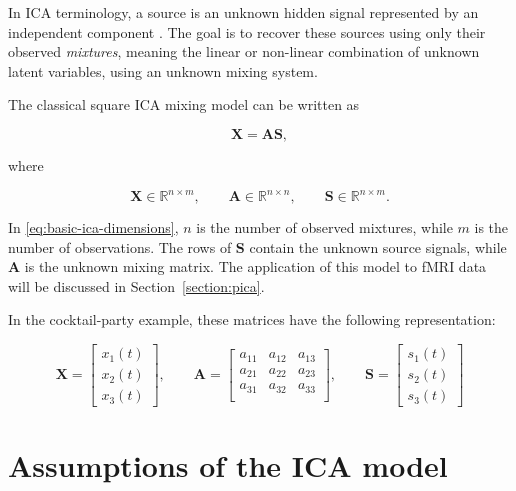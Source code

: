 \documentclass[english]{pwr_wmat_praca_dyplomowa}
\theoremstyle{definition}
\theoremstyle{remark}
\begin{document}
In ICA terminology, a source is an unknown hidden signal represented by an independent component \cite{ica}. The goal is to recover these sources using only their observed \textit{mixtures}, meaning the linear or non-linear combination of unknown latent variables, using an unknown mixing system.

The classical square ICA mixing model can be written as

\begin{equation}
    \mathbf{X} = \mathbf{A}\mathbf{S},
    \label{eq:basic-ica}
\end{equation}

where

\begin{equation}
    \mathbf{X} \in \mathbb{R}^{n\times m},
    \qquad
    \mathbf{A} \in \mathbb{R}^{n\times n}, 
    \qquad
    \mathbf{S} \in \mathbb{R}^{n\times m}.
    \label{eq:basic-ica-dimensions}
\end{equation}

In \eqref{eq:basic-ica-dimensions}, $n$ is the number of observed mixtures, while $m$ is the number of observations. The rows of $\mathbf{S}$ contain the unknown source signals, while $\mathbf{A}$ is the unknown mixing matrix. The application of this model to fMRI data will be discussed in Section~\ref{section:pica}.

In the cocktail-party example, these matrices have the following representation:

\begin{equation}
    \mathbf{X} = \begin{bmatrix}x_1(t) \\ x_2(t) \\ x_3(t)\end{bmatrix}
    , \qquad
    \mathbf{A} = 
    \begin{bmatrix}
    a_{11} & a_{12} & a_{13} \\ 
    a_{21} & a_{22} & a_{23} \\ 
    a_{31} & a_{32} & a_{33} \\ 
    \end{bmatrix}
    , \qquad
    \mathbf{S} = \begin{bmatrix}s_1(t) \\ s_2(t) \\ s_3(t)\end{bmatrix}
\end{equation}

\section{Assumptions of the ICA model}
\end{document}
